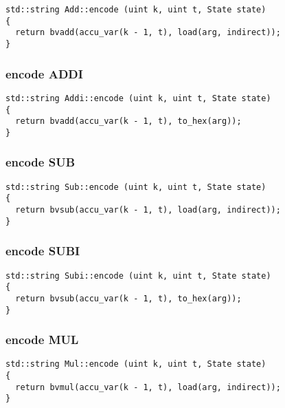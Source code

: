 \begin{lstlisting}[style=c++]
std::string Add::encode (uint k, uint t, State state)
{
  return bvadd(accu_var(k - 1, t), load(arg, indirect));
}
\end{lstlisting}

\subsubsection{encode ADDI}

\begin{lstlisting}[style=c++]
std::string Addi::encode (uint k, uint t, State state)
{
  return bvadd(accu_var(k - 1, t), to_hex(arg));
}
\end{lstlisting}

\subsubsection{encode SUB}

\begin{lstlisting}[style=c++]
std::string Sub::encode (uint k, uint t, State state)
{
  return bvsub(accu_var(k - 1, t), load(arg, indirect));
}
\end{lstlisting}

\subsubsection{encode SUBI}

\begin{lstlisting}[style=c++]
std::string Subi::encode (uint k, uint t, State state)
{
  return bvsub(accu_var(k - 1, t), to_hex(arg));
}
\end{lstlisting}

\subsubsection{encode MUL}

\begin{lstlisting}[style=c++]
std::string Mul::encode (uint k, uint t, State state)
{
  return bvmul(accu_var(k - 1, t), load(arg, indirect));
}
\end{lstlisting}


